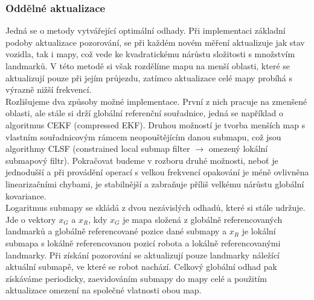 \documentclass[11pt]{article}
\begin{document}
\subsubsection{Oddělné aktualizace}
Jedná se o metody vytvářející optimální odhady. Při implementaci základní podoby aktualizace pozorování, se při každém novém měření aktualizuje jak stav vozidla, tak i mapy, což vede ke kvadratickému nárůstu složitosti s množstvím landmarků. V této metodě si však rozdělíme mapu na menší oblasti, které se aktualizují pouze při jejím průjezdu, zatímco aktualizace celé mapy probíhá s výrazně nižší frekvencí.\\
\indent Rozlišujeme dva způsoby možné implementace. První z nich pracuje na zmenšené oblasti, ale stále si drží globální referenční souřadnice, jedná se například o algoritmus CEKF (compressed EKF). Druhou možností je tvorba menších map s vlastním souřadnicovým rámcem neopouštějícím danou submapu, což jsou algorithmy CLSF (constrained local submap filter $\rightarrow$ omezený lokální submapový filtr). Pokračovat budeme v rozboru druhé možnosti, neboť je jednodušší a při provádění operací s velkou frekvencí opakování je méně ovlivněna linearizačními chybami, je stabilnější a zabraňuje příliš velkému nárůstu globální kovariance. \\
\indent Logaritmus submapy se skládá z dvou nezávislých odhadů, které si stále udržuje. Jde o vektory $x_G$ a $x_R$, kdy $x_G$ je mapa složená z globálně referencovaných landmarků a globálně referencované pozice dané submapy a $x_R$ je lokální submapa s lokálně referencovanou pozicí robota a lokálně referencovanými landmarky. Při získání pozorování se aktualizují pouze landmarky náležící aktuální submapě, ve které se robot nachází. Celkový globální odhad pak získáváme periodicky, zaevidováním submapy do mapy celé a použitím aktualizace omezení na společné vlatnosti obou map.
\end{document}
